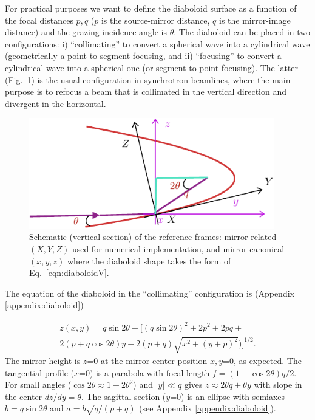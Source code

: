 \documentclass{iucr}              %
\begin{document}
For practical purposes we want to define the diaboloid surface as a function of the focal distances $p,q$ ($p$ is the source-mirror distance, $q$ is the mirror-image distance) and the grazing incidence angle is $\theta$. The diaboloid can be placed in two configurations: i) ``collimating'' to convert a spherical wave into a cylindrical wave (geometrically a point-to-segment focusing, and ii) ``focusing'' to convert a cylindrical wave into a spherical one (or segment-to-point focusing). The latter (Fig.~\ref{fig:frame}) is the usual configuration in synchrotron beamlines, where the main purpose is to refocus a beam that is collimated in the vertical direction and divergent in the horizontal. 



\begin{figure}\label{fig:frame}
\includegraphics[width=0.95\textwidth]{figures/fig1.pdf}
%

\caption{Schematic (vertical section) of the reference frames: mirror-related $(X,Y,Z)$ used for numerical implementation, and mirror-canonical $(x,y,z)$ where the diaboloid shape takes the form of Eq.~\ref{eqn:diaboloidV}. }
\end{figure}



The equation of the diaboloid in the ``collimating'' configuration is (Appendix \ref{appendix:diaboloid})

\begin{multline}
\label{eqn:diaboloidV}
z(x,y) = q \sin2\theta - 
[ (q \sin{2\theta})^2 + 2p^2 + 2 p q + \\
2 (p + q \cos{2\theta}) y - 
2 (p+q)  \sqrt{x^2 + (y + p)^2}) 
]^{1/2}.
\end{multline}
The mirror height is $z$=0 at the mirror center position $x, y$=0, as expected. The tangential profile ($x$=0) is a parabola with focal length $ f = (1-\cos2\theta) q/2$. For small angles ($\cos2\theta\approx 1 - 2\theta^2$) and $|y|\ll q$ gives $z\approx 2 \theta q + \theta y$ with slope in the center $dz/dy=\theta$. The sagittal section ($y$=0) is an ellipse with semiaxes $b=q \sin2\theta$ and $a=b \sqrt{q /(p+q)}$ (see Appendix \ref{appendix:diaboloid}). 
\end{document}
